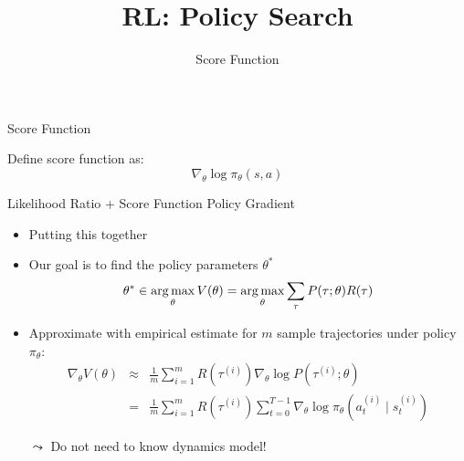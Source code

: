 


\title[RL: Score Function]{RL: Policy Search}
\subtitle{Score Function}




	
	\maketitle

\begin{frame}[c]{Score Function}


Define score function as:
$$\nabla_\theta \log \pi_\theta (s,a) $$


\end{frame}
\begin{frame}[c]{Likelihood Ratio + Score Function Policy Gradient}
	
	\begin{itemize}
		\item Putting this together
		\item Our goal is to find the policy parameters $\theta^*$
		$$\theta^* \in \operatorname*{arg\,max}_{\theta} V(\theta) = \operatorname*{arg\,max}_{\theta}\sum_{\tau} P(\tau; \theta) R(\tau) $$
		\item Approximate with empirical estimate for $m$ sample trajectories under
		policy $\pi_\theta$:
		\begin{eqnarray}
		\nabla_\theta V(\theta) &\approx& \frac{1}{m} \sum_{i=1}^{m} R(\tau^{(i)}) \nabla_\theta \log P(\tau^{(i)}; \theta) \nonumber\\
		&=& \frac{1}{m} \sum_{i=1}^{m} R(\tau^{(i)}) \sum_{t=0}^{T-1} \nabla_\theta \log \pi_\theta (a_t^{(i)} \mid s_t^{(i)})
		\end{eqnarray}
		\item[$\leadsto$] Do not need to know dynamics model!
		
	\end{itemize}
	
\end{frame}
